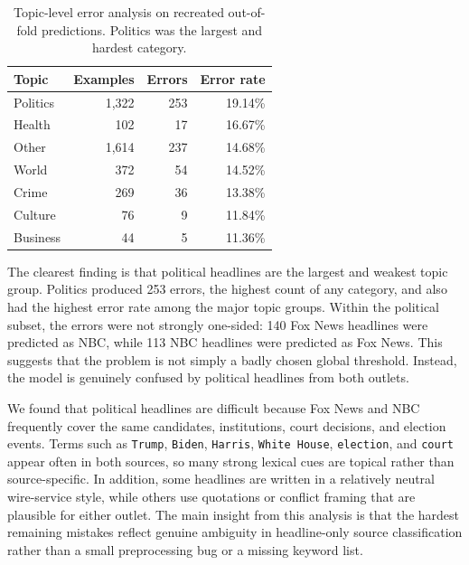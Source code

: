 \documentclass[10pt]{article}
\begin{document}
\begin{table}[h]
\centering
\small
\begin{tabular}{lrrr}
\hline
Topic & Examples & Errors & Error rate \\
\hline
Politics & 1,322 & 253 & 19.14\% \\
Health & 102 & 17 & 16.67\% \\
Other & 1,614 & 237 & 14.68\% \\
World & 372 & 54 & 14.52\% \\
Crime & 269 & 36 & 13.38\% \\
Culture & 76 & 9 & 11.84\% \\
Business & 44 & 5 & 11.36\% \\
\hline
\end{tabular}
\caption{Topic-level error analysis on recreated out-of-fold predictions. Politics was the largest and hardest category.}
\label{tab:politics-error-analysis}
\end{table}

The clearest finding is that political headlines are the largest and weakest topic group. Politics produced 253 errors, the highest count of any category, and also had the highest error rate among the major topic groups. Within the political subset, the errors were not strongly one-sided: 140 Fox News headlines were predicted as NBC, while 113 NBC headlines were predicted as Fox News. This suggests that the problem is not simply a badly chosen global threshold. Instead, the model is genuinely confused by political headlines from both outlets.

We found that political headlines are difficult because Fox News and NBC frequently cover the same candidates, institutions, court decisions, and election events. Terms such as \texttt{Trump}, \texttt{Biden}, \texttt{Harris}, \texttt{White House}, \texttt{election}, and \texttt{court} appear often in both sources, so many strong lexical cues are topical rather than source-specific. In addition, some headlines are written in a relatively neutral wire-service style, while others use quotations or conflict framing that are plausible for either outlet. The main insight from this analysis is that the hardest remaining mistakes reflect genuine ambiguity in headline-only source classification rather than a small preprocessing bug or a missing keyword list.
\end{document}
